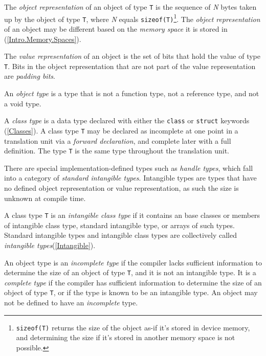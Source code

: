 

\p The \textit{object representation} of an object of type \texttt{T} is the
sequence of \textit{N} bytes taken up by the object of type \texttt{T}, where
\textit{N} equals \texttt{sizeof(T)}\footnote{\texttt{sizeof(T)} returns the
size of the object as-if it's stored in device memory, and determining the size
if it's stored in another memory space is not possible.}. The \textit{object
representation} of an object may be different based on the \textit{memory space}
it is stored in (\ref{Intro.Memory.Spaces}).

\p The \textit{value representation} of an object is the set of bits that hold
the value of type \texttt{T}. Bits in the object representation that are not
part of the value representation are \textit{padding bits}.

\p An \textit{object type} is a type that is not a function type, not a
reference type, and not a void type.

\p A \textit{class type} is a data type declared with either the \texttt{class}
or \texttt{struct} keywords (\ref{Classes}). A class type \texttt{T} may be
declared as incomplete at one point in a translation unit via a \textit{forward
declaration}, and complete later with a full definition. The type \texttt{T} is
the same type throughout the translation unit.

\p There are special implementation-defined types such as \textit{handle types},
which fall into a category of \textit{standard intangible types}. Intangible
types are types that have no defined object representation or value
representation, as such the size is unknown at compile time.

\p A class type \texttt{T} is an \textit{intangible class type} if it contains
an base classes or members of intangible class type, standard intangible type,
or arrays of such types. Standard intangible types and intangible class types
are collectively called \textit{intangible types}(\ref{Intangible}).

\p An object type is an \textit{incomplete type} if the compiler lacks
sufficient information to determine the size of an object of type \texttt{T},
and it is not an intangible type. It is a \textit{complete type} if the compiler
has sufficient information to determine the size of an object of type
\texttt{T}, or if the type is known to be an intangible type. An object may not
be defined to have an \textit{incomplete} type.

